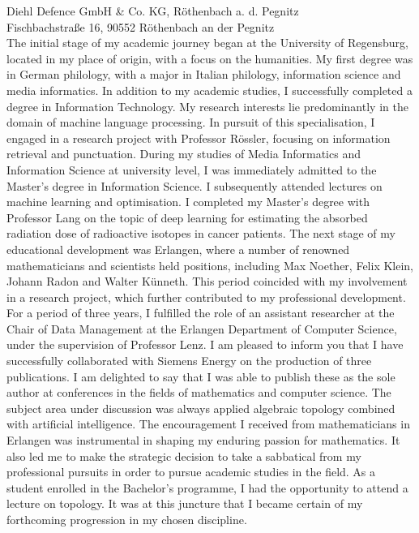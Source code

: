 \documentclass[11pt]{letter}
\begin{document}
\begin{letter}{%
Diehl Defence GmbH & Co. KG, Röthenbach a. d. Pegnitz\\%
Fischbachstraße 16, 90552 Röthenbach an der Pegnitz\\%
}
The initial stage of my academic journey began at the University of Regensburg, located in my place of origin, with a focus on the humanities. My first degree was in German philology, with a major in Italian philology, information science and media informatics. In addition to my academic studies, I successfully completed a degree in Information Technology. My research interests lie predominantly in the domain of machine language processing. In pursuit of this specialisation, I engaged in a research project with Professor Rössler, focusing on information retrieval and punctuation. During my studies of Media Informatics and Information Science at university level, I was immediately admitted to the Master's degree in Information Science. I subsequently attended lectures on machine learning and optimisation. I completed my Master's degree with Professor Lang on the topic of deep learning for estimating the absorbed radiation dose of radioactive isotopes in cancer patients. The next stage of my educational development was Erlangen, where a number of renowned mathematicians and scientists held positions, including Max Noether, Felix Klein, Johann Radon and Walter Künneth. This period coincided with my involvement in a research project, which further contributed to my professional development. For a period of three years, I fulfilled the role of an assistant researcher at the Chair of Data Management at the Erlangen Department of Computer Science, under the supervision of Professor Lenz. I am pleased to inform you that I have successfully collaborated with Siemens Energy on the production of three publications. I am delighted to say that I was able to publish these as the sole author at conferences in the fields of mathematics and computer science. The subject area under discussion was always applied algebraic topology combined with artificial intelligence. The encouragement I received from mathematicians in Erlangen was instrumental in shaping my enduring passion for mathematics. It also led me to make the strategic decision to take a sabbatical from my professional pursuits in order to pursue academic studies in the field. As a student enrolled in the Bachelor's programme, I had the opportunity to attend a lecture on topology. It was at this juncture that I became certain of my forthcoming progression in my chosen discipline.


\end{letter}
\end{document}
